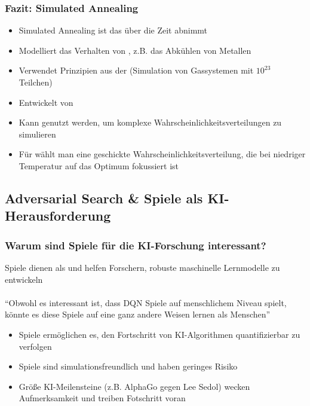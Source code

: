 \subsubsection*{Fazit: Simulated Annealing}
\begin{itemize}
    \item Simulated Annealing ist  das über die Zeit abnimmt
    \item Modelliert das Verhalten von , z.B. das Abkühlen von Metallen
\end{itemize}
\begin{itemize}
    \item Verwendet Prinzipien aus der  (Simulation von Gassystemen mit $10^{23}$ Teilchen)
    \item Entwickelt von 
\end{itemize}
\begin{itemize}
    \item Kann genutzt werden, um komplexe Wahrscheinlichkeitsverteilungen zu simulieren
    \item Für  wählt man eine geschickte Wahrscheinlichkeitsverteilung, die bei niedriger Temperatur auf das Optimum fokussiert ist
\end{itemize}
\subsection{Adversarial Search \& Spiele als KI-Herausforderung}
\subsubsection*{Warum sind Spiele für die KI-Forschung interessant?}
Spiele dienen als  und helfen Forschern, robuste maschinelle Lernmodelle zu entwickeln\\
\\
\enquote{Obwohl es interessant ist, dass DQN Spiele auf menschlichem Niveau spielt, könnte es diese Spiele auf eine ganz andere Weisen lernen als Menschen}\\
\begin{itemize}
    \item {} Spiele ermöglichen es, den Fortschritt von KI-Algorithmen quantifizierbar zu verfolgen
    \item {} Spiele sind simulationsfreundlich und haben geringes Risiko
    \item {} Größe KI-Meilensteine (z.B. AlphaGo gegen Lee Sedol) wecken Aufmerksamkeit und treiben Fotschritt voran
\end{itemize}

